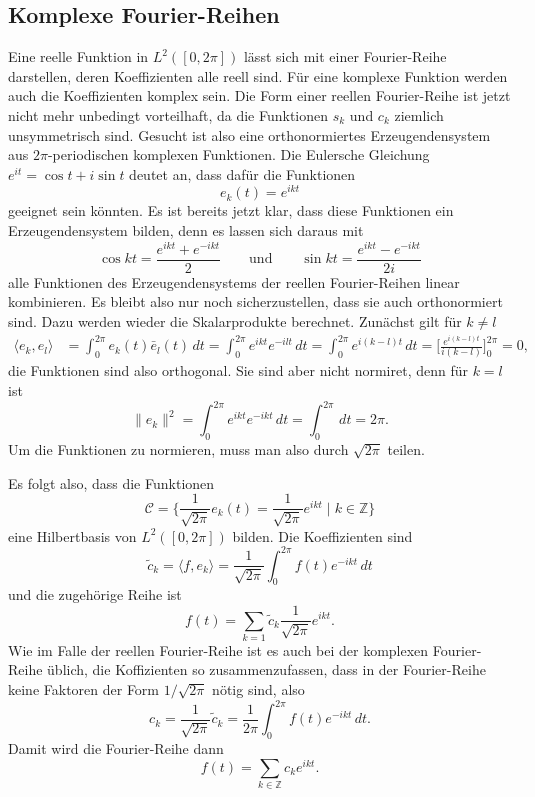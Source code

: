\subsection{Komplexe Fourier-Reihen}
Eine reelle Funktion in $L^2([0,2\pi])$ lässt sich mit einer Fourier-Reihe
darstellen, deren Koeffizienten alle reell sind.
Für eine komplexe Funktion werden auch die Koeffizienten komplex sein.
Die Form einer reellen Fourier-Reihe ist jetzt nicht mehr unbedingt
vorteilhaft, da die Funktionen $s_k$ und $c_k$ ziemlich unsymmetrisch
sind.
Gesucht ist also eine orthonormiertes Erzeugendensystem aus
$2\pi$-periodischen komplexen Funktionen.
Die Eulersche Gleichung $e^{it} = \cos t + i\sin t$ deutet an, dass
dafür die Funktionen
\[
e_k(t) = e^{ikt}
\]
geeignet sein könnten.
Es ist bereits jetzt klar, dass diese Funktionen ein Erzeugendensystem
bilden, denn es lassen sich daraus mit
\[
\cos kt = \frac{e^{ikt}+e^{-ikt}}2
\qquad\text{und}\qquad
\sin kt = \frac{e^{ikt}-e^{-ikt}}{2i}
\]
alle Funktionen des Erzeugendensystems
der reellen Fourier-Reihen linear kombinieren.
Es bleibt also nur noch sicherzustellen, dass sie auch orthonormiert
sind.
Dazu werden wieder die Skalarprodukte berechnet.
Zunächst gilt für $k\ne l$
\begin{align*}
\langle e_k,e_l\rangle
&=
\int_0^{2\pi} e_k(t) \bar{e}_l(t) \,dt
=
\int_0^{2\pi} e^{ikt}e^{-ilt}\,dt
=
\int_0^{2\pi} e^{i(k-l)t}\,dt
=
\biggl[ \frac{e^{i(k-l)t}}{i(k-l)} \biggr]_0^{2\pi} 
=
0,
\end{align*}
die Funktionen sind also orthogonal.
Sie sind aber nicht normiret, denn für $k=l$ ist 
\[
\|e_k\|^2
=
\int_0^{2\pi} e^{ikt}e^{-ikt}\,dt
=
\int_0^{2\pi} \,dt = 2\pi.
\]
Um die Funktionen zu normieren, muss man also durch $\sqrt{2\pi}$ teilen.

Es folgt also, dass die Funktionen
\[
\mathcal{C}
=
\biggl\{
\frac1{\sqrt{2\pi}} e_k(t)
=
\frac1{\sqrt{2\pi}} e^{ikt}\;\bigg|\; k\in\mathbb Z
\biggr\}
\]
eine Hilbertbasis von $L^2([0,2\pi])$ bilden.
Die Koeffizienten sind 
\[
\tilde{c}_k 
=
\langle f, e_k\rangle
=
\frac1{\sqrt{2\pi}}
\int_0^{2\pi} f(t) e^{-ikt}\,dt
\]
und die zugehörige Reihe ist
\[
f(t)
=
\sum_{k=1} \tilde{c}_k \frac{1}{\sqrt{2\pi}} e^{ikt}.
\]
Wie im Falle der reellen Fourier-Reihe ist es auch bei der komplexen
Fourier-Reihe üblich, die Koffizienten so zusammenzufassen, dass in der
Fourier-Reihe keine Faktoren der Form $1/\sqrt{2\pi}$ nötig sind, also
\[
c_k
=
\frac1{\sqrt{2\pi}} \tilde{c}_k
=
\frac1{2\pi} \int_0^{2\pi} f(t) e^{-ikt}\,dt.
\]
Damit wird die Fourier-Reihe dann
\[
f(t) = \sum_{k\in\mathbb Z} c_k e^{ikt}.
\]

